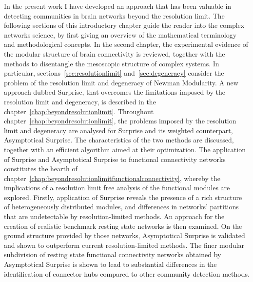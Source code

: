 In the present work I have developed an approach that has been valuable in detecting communities in brain networks beyond the resolution limit. The following sections of this introductory chapter guide the reader into the complex networks science, by first giving an overview of the mathematical terminology and methodological concepts.
In the second chapter, the experimental evidence of the modular structure of brain connectivity is reviewed, together with the methods to disentangle the mesoscopic structure of complex systems. In particular, sections~\ref{sec:resolutionlimit} and~\ref{sec:degeneracy} consider the problem of the resolution limit and degeneracy of Newman Modularity.
A new approach dubbed Surprise, that overcomes the limitations imposed by the resolution limit and degeneracy, is described in the chapter~\ref{chap:beyondresolutionlimit}. Throughout chapter~\ref{chap:beyondresolutionlimit}, the problems imposed by the resolution limit and degeneracy are analysed for Surprise and its weighted counterpart, Asymptotical Surprise. The characteristics of the two methods are discussed, together with an efficient algorithm aimed at their optimization.
The application of Surprise and Asymptotical Surprise to functional connectivity networks constitutes the hearth of chapter~\ref{chap:beyondresolutionlimitfunctionalconnectivity}, whereby the implications of a resolution limit free analysis of the functional modules are explored. Firstly, application of Surprise reveals the presence of a rich structure of heterogeneously distributed modules, and differences in networks' partitions that are undetectable by resolution-limited methods. An approach for the creation of realistic benchmark resting state networks is then examined. On the ground structure provided by those networks, Asymptotical Surprise is validated and shown to outperform current resolution-limited methods. The finer modular subdivision of resting state functional connectivity networks obtained by Asymptotical Surprise is shown to lead to substantial differences in the identification of connector hubs compared to other community detection methods.

